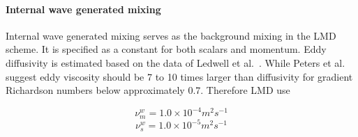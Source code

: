 \paragraph{Internal wave generated mixing}
Internal wave generated mixing serves as the background mixing in the
LMD scheme.  It is specified as a constant for both scalars and
momentum.  Eddy diffusivity is estimated based on the data of Ledwell
et al.\ \cite{LWL93}.  While Peters et al.\ \cite{Peters88} suggest
eddy viscosity should be 7 to 10 times larger than diffusivity for
gradient Richardson numbers below approximately 0.7.  Therefore LMD use

\begin{equation}
\nu_{m}^w=1.0 \times 10^{-4} m^2 s^{-1}
\end{equation}
\begin{equation}
\nu_{s}^w=1.0 \times 10^{-5} m^2 s^{-1}
\end{equation}

